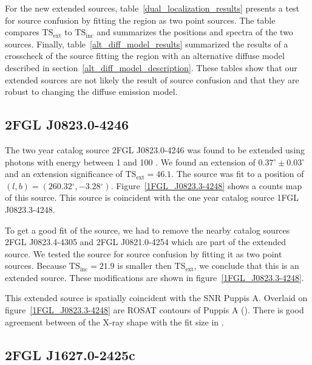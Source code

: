 \documentclass[12pt,preprint]{aastex}
\newcommand{\gev}{\text{GeV}\xspace}
\newcommand{\tsext}{{\ensuremath{\text{TS}_\text{ext}}}\xspace}
\newcommand{\tsinc}{\ensuremath{\text{TS}_\text{inc}}\xspace}
\renewcommand{\deg}{\ensuremath{^\circ}\xspace}
\begin{document}
For the new extended sources, table~\ref{dual_localization_results}
presents a test for source confusion by fitting the region
as two point sources. The table compares \tsext
to \tsinc and summarizes the positions and spectra of the two sources.
Finally, table~\ref{alt_diff_model_results} summarized the results of
a crosscheck of the source fitting the region with an alternative diffuse
model described in section~\ref{alt_diff_model_description}.  These tables
show that our extended sources are not likely the result of source confusion
and that they are robust to changing the diffuse emission model.


\subsection{2FGL J0823.0-4246}
\label{section_2FGL_J0823.0-4246}


The two year catalog source 2FGL J0823.0-4246 was found to be
extended using photons with energy between 1 \gev and 100 \gev.
We found an extension of $0.37\deg\pm0.03\deg$ and an extension
significance of $\tsext=46.1$.  The source was fit to a position of
$(l,b)=(260.32\deg,-3.28\deg)$.  Figure~\ref{1FGL_J0823.3-4248} shows a
counts map of this source.  This source is coincident with the one year
catalog source 1FGL J0823.3-4248.

To get a good fit of the source, we had to remove the nearby catalog
sources 2FGL J0823.4-4305 and 2FGL J0821.0-4254 which are part of the
extended source.  We tested the source for source confusion by fitting
it as two point sources. Because $\tsinc=21.9$ is smaller then \tsext,
we conclude that this is an extended source.  
These modifications are shown in
figure~\ref{1FGL_J0823.3-4248}.

This extended source is spatially coincident with the SNR Puppis A.
Overlaid on figure~\ref{1FGL_J0823.3-4248} are ROSAT contours of Puppis
A (\cite{rosat_puppis_a}). There is good agreement between of the X-ray
shape with the fit size in \gev.


\subsection{2FGL J1627.0-2425c}
\label{section_2FGL_J1627.0-2425c}
\end{document}
